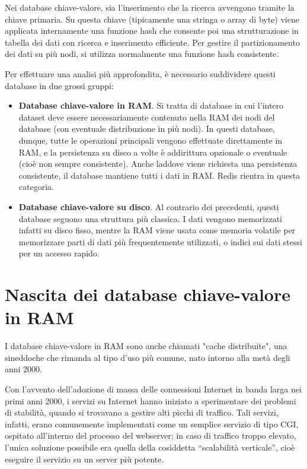 Nei database chiave-valore, sia l'inserimento che la ricerca avvengono tramite
la chiave primaria. Su questa chiave (tipicamente una stringa o array di byte)
viene applicata internamente una funzione hash che consente poi una strutturazione
in tabella dei dati con ricerca e inserimento efficiente. Per gestire il partizionamento
dei dati su più nodi, si utilizza normalmente una funzione hash consistente.

Per effettuare una analisi più approfondita, è necessario sud\-di\-vi\-de\-re
questi database in due grossi gruppi:

\begin{itemize}
	\medskip
	\item
	\textbf{Database chiave-valore in RAM}. Si tratta di database in cui l'intero dataset
	deve essere necessariamente contenuto nella RAM dei nodi del database
	(con eventuale distribuzione in più nodi). In questi database, dunque, tutte
	le operazioni principali vengono effettuate direttamente in RAM, e la persistenza
	su disco a volte è addirittura opzionale o eventuale (cioè non sempre consistente).
	Anche laddove viene richiesta una persistenza consistente, il database mantiene
	tutti i dati in RAM. Redis rientra in questa categoria.

	\item
	\textbf{Database chiave-valore su disco}. Al contrario dei precedenti, questi
	database seguono una struttura più classica. I dati vengono memorizzati infatti
	su disco fisso, mentre la RAM viene usata come memoria volatile per memorizzare
	parti di dati più frequentemente utilizzati, o indici sui dati stessi per un
	accesso rapido.
\end{itemize}

\section{Nascita dei database chiave-valore in RAM}
\label{sec:birth}

I database chiave-valore in RAM sono anche chiamati "cache distribuite", una sineddoche
che rimanda al tipo d'uso più comune, nato intorno alla metà degli anni 2000.

Con l'avvento dell'adozione di massa delle connessioni Internet in banda larga nei primi
anni 2000, i servizi su Internet hanno iniziato a sperimentare dei problemi di stabilità,
quando si trovavano a gestire alti picchi di traffico. Tali servizi, infatti, erano
comunemente implementati come un semplice servizio di tipo CGI, ospitato all'interno
del processo del webserver; in caso di traffico troppo elevato, l'unica soluzione possibile
era quella della cosiddetta ``scalabilità verticale'', cioè eseguire il servizio su un
server più potente.

